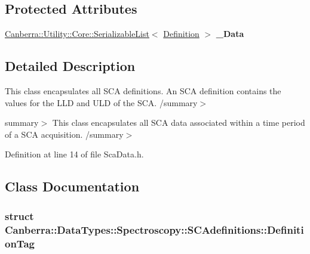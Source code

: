 \subsection*{Protected Attributes}
\begin{DoxyCompactItemize}
\item 
\mbox{\label{class_canberra_1_1_data_types_1_1_spectroscopy_1_1_s_c_adefinitions_a6db09d05ddd00325d10e4c4a43e3a51d}} 
\hyperlink{class_canberra_1_1_utility_1_1_core_1_1_serializable_list}{Canberra\+::\+Utility\+::\+Core\+::\+Serializable\+List}$<$ \hyperlink{class_canberra_1_1_data_types_1_1_spectroscopy_1_1_s_c_adefinitions_de/d00/struct_canberra_1_1_data_types_1_1_spectroscopy_1_1_s_c_adefinitions_1_1_definition_tag}{Definition} $>$ {\bfseries \+\_\+\+Data}
\end{DoxyCompactItemize}


\subsection{Detailed Description}
This class encapsulates all S\+CA definitions. An S\+CA definition contains the values for the L\+LD and U\+LD of the S\+CA. /summary$>$ 

summary$>$ This class encapsulates all S\+CA data associated within a time period of a S\+CA acquisition. /summary$>$ 

Definition at line 14 of file Sca\+Data.\+h.



\subsection{Class Documentation}
\label{struct_canberra_1_1_data_types_1_1_spectroscopy_1_1_s_c_adefinitions_1_1_definition_tag}
\subsubsection{struct Canberra\+:\+:Data\+Types\+:\+:Spectroscopy\+:\+:S\+C\+Adefinitions\+:\+:Definition\+Tag}


